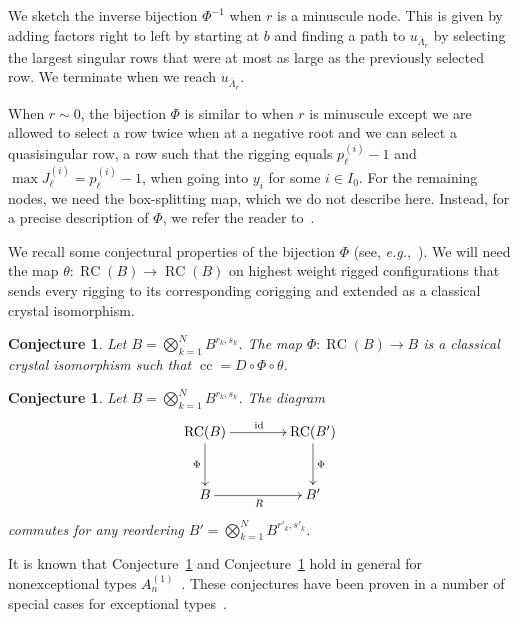 \documentclass[reqno]{amsart}
\newcommand{\clfw}{\overline{\Lambda}} %
\DeclareMathOperator{\RC}{RC} %
\DeclareMathOperator{\cc}{cc} %
\DeclareMathOperator{\id}{id} %
\theoremstyle{plain}
\newtheorem{conj}[thm]{Conjecture}
\theoremstyle{definition}
\numberwithin{equation}{section}
\begin{document}
We sketch the inverse bijection $\Phi^{-1}$ when $r$ is a minuscule node.
This is given by adding factors right to left by starting at $b$ and finding a path to $u_{\clfw_r}$ by selecting the largest singular rows that were at most as large as the previously selected row.
We terminate when we reach $u_{\clfw_r}$.

When $r \sim 0$, the bijection $\Phi$ is similar to when $r$ is minuscule except we are allowed to select a row twice when at a negative root and we can select a quasisingular row, a row such that the rigging equals $p_{\ell}^{(i)} - 1$ and $\max J_{\ell}^{(i)} = p_{\ell}^{(i)} - 1$, when going into $y_i$ for some $i \in I_0$.
For the remaining nodes, we need the box-splitting map, which we do not describe here.
Instead, for a precise description of $\Phi$, we refer the reader to~\cite{KSS02, OSSS16, OSS17, Scrimshaw17}.

We recall some conjectural properties of the bijection $\Phi$ (see, \textit{e.g.},~\cite{SchillingS15}).
We will need the map $\theta \colon \RC(B) \to \RC(B)$ on highest weight rigged configurations that sends every rigging to its corresponding corigging and extended as a classical crystal isomorphism.

\begin{conj}
\label{conj:bijection}
Let $B = \bigotimes_{k=1}^N B^{r_k,s_k}$.
The map $\Phi \colon \RC(B) \to B$ is a classical crystal isomorphism such that $\cc = D \circ \Phi \circ \theta$.
\end{conj}

\begin{conj}
\label{conj:R_matrix_identity}
Let $B = \bigotimes_{k=1}^N B^{r_k,s_k}$.
The diagram
\[
\xymatrixcolsep{4em}
\xymatrixrowsep{3em}
\xymatrix{
\RC(B) \ar[r]^{\id} \ar[d]_{\Phi} & \RC(B') \ar[d]^{\Phi}
\\ B \ar[r]_{R} & B'
}
\]
commutes for any reordering $B' = \bigotimes_{k=1}^N B^{r'_k,s'_k}$.
\end{conj}

It is known that Conjecture~\ref{conj:bijection} and Conjecture~\ref{conj:R_matrix_identity} hold in general for nonexceptional types $A_n^{(1)}$~\cite{KSS02,OSSS16,OSS17}.
These conjectures have been proven in a number of special cases for exceptional types~\cite{OS12,SchillingS15,SS2006,Scrimshaw15,Scrimshaw17}.
\end{document}
